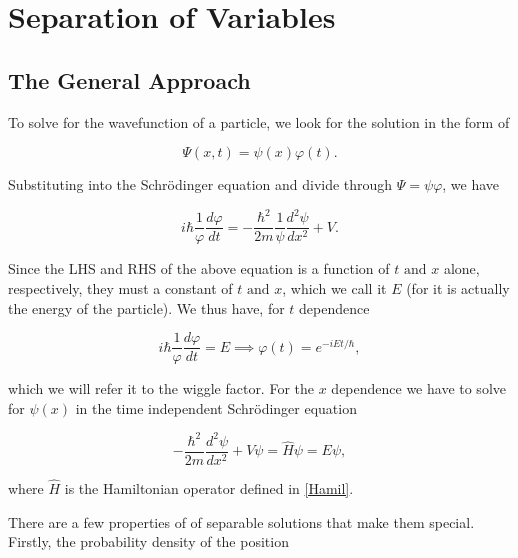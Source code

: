 \documentclass[a4paper,12pt]{report}
\begin{document}



\chapter{Separation of Variables}

\section{The General Approach}

To solve for the wavefunction of a particle, we look for the solution in the form of 

\begin{equation}
  \Psi (x,t) = \psi (x)\varphi (t).
\end{equation}

Substituting into the Schrödinger equation and divide through \(\Psi = \psi \varphi\), we have

\begin{equation}
  i \hbar \frac{1}{\varphi } \frac{d\varphi }{dt} = -\frac{\hbar ^2}{2m} \frac{1}{\psi } \frac{d^2\psi }{dx^2} + V.    
\end{equation}

Since the LHS and RHS of the above equation is a function of \(t \text { and } x\) alone, respectively, they must a constant of \(t \text { and } x\), which we call it \(E\) (for it is actually the energy of the particle). We thus have, for \(t\) dependence

\begin{equation}
  i \hbar \frac{1}{\varphi } \frac{d\varphi }{dt} = E \implies \varphi (t) = e^{-iEt /\hbar  },
\end{equation}

which we will refer it to the wiggle factor. For the \(x\) dependence we have to solve for \(\psi (x)\) in the time independent Schrödinger equation

\begin{equation}
  - \frac{\hbar ^2}{2m} \frac{d^2\psi }{dx^2} + V\psi = \hat{H}\psi = E\psi, \label{psix} 
\end{equation}

where \(\hat{H}\) is the Hamiltonian operator defined in \cref{Hamil}.

There are a few properties of of separable solutions that make them special. Firstly, the probability density of the position 
\end{document}
